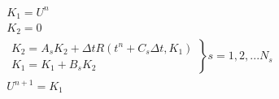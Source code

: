 \documentclass[10pt]{article} %
\begin{document}
\color{fgC}\[\begin{matrix}
 K_1 = U^n \\ 
 K_2 = 0 \\
\left.\begin{matrix}
 K_2 = A_s K_2 + \Delta t R(t^n + C_s \Delta t, K_1) \\ 
 K_1 = K_1 + B_s K_2
\end{matrix}\right\} s=1,2,...N_s\\
U^{n+1} = K_1
\end{matrix}
\]
\end{document}
